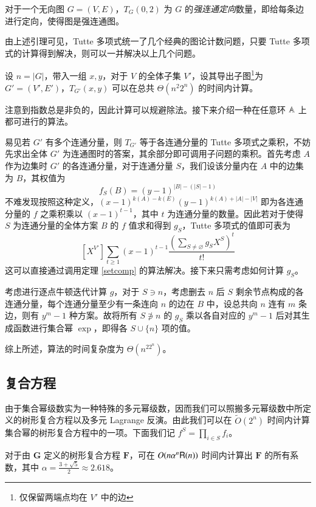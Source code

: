 \begin{lemma}
对于一个无向图 $G = (V, E)$，$T_G(0,2)$ 为 $G$ 的\emph{强连通定向}数量，即给每条边进行定向，使得图是强连通图。
\end{lemma}

由上述引理可见，Tutte 多项式统一了几个经典的图论计数问题，只要 Tutte 多项式的计算得到解决，则可以一并解决以上几个问题。

\begin{theorem}
设 $n=|G|$，带入一组 $x,y$，对于 $V$ 的全体子集 $V'$，设其导出子图\footnote{仅保留两端点均在 $V'$ 中的边}为 $G'=(V',E')$，$T_{G'}(x,y)$ 可以在总共 $\Theta(n^2 2^n)$ 的时间内计算。
\end{theorem}

注意到指数总是非负的，因此计算可以规避除法。接下来介绍一种在任意环 $\mathbb A$ 上都可进行的算法。

易见若 $G'$ 有多个连通分量，则 $T_{G'}$ 等于各连通分量的 Tutte 多项式之乘积，不妨先求出全体 $G'$ 为连通图时的答案，其余部分即可调用子问题的乘积。首先考虑 $A$ 作为边集时 $G'$ 的各连通分量，对于连通分量 $S$，我们设该分量内在 $A$ 中的边集为 $B$，其权值为
$$
f_S(B)=(y-1)^{|B|-(|S|-1)}
$$
不难发现按照这种定义，$(x-1)^{k(A)-k(E)}(y-1)^{k(A)+|A|-|V|}$ 即为各连通分量的 $f$ 之乘积乘以 $(x-1)^{t-1}$，其中 $t$ 为连通分量的数量。因此若对于使得 $S$ 为连通分量的全体方案 $B$ 的 $f$ 值求和得到 $g_S$，Tutte 多项式的值即可表为
$$
[X^{V'}] \sum_{t\ge 1} (x-1)^{t-1}\frac{\left( \sum_{S\neq \varnothing} g_S X^S \right)^t}{t!}
$$
这可以直接通过调用定理 \ref{setcomp} 的算法解决。接下来只需考虑如何计算 $g_S$。

考虑进行逐点牛顿迭代计算 $g$，对于 $S\ni n$，考虑删去 $n$ 后 $S$ 剩余节点构成的各连通分量，每个连通分量至少有一条连向 $n$ 的边在 $B$ 中，设总共向 $n$ 连有 $m$ 条边，则有 $y^m-1$ 种方案。故将所有 $S\not \ni n$ 的 $g_S$ 乘以各自对应的 $y^m-1$ 后对其生成函数进行集合幂 $\exp$，即得各 $S\cup \{n\}$ 项的值。

综上所述，算法的时间复杂度为 $\Theta(n^22^n)$。

\subsection{复合方程}

由于集合幂级数实为一种特殊的多元幂级数，因而我们可以照搬多元幂级数中所定义的树形复合方程以及多元 Lagrange 反演。由此我们可以在 $\tilde O(2^n)$ 时间内计算集合幂的树形复合方程中的一项。下面我们记 $f^S = \prod_{i\in S} f_i$。

\begin{theorem}
  对于由 $\mathbf G$ 定义的树形复合方程 $\mathbf F$，可在 $O(n\alpha^n \mathsf R(n))$ 时间内计算出 $\mathbf F$ 的所有系数，其中 $\alpha = \frac{3+\sqrt 5}2 \approx 2.618$。
\end{theorem}

